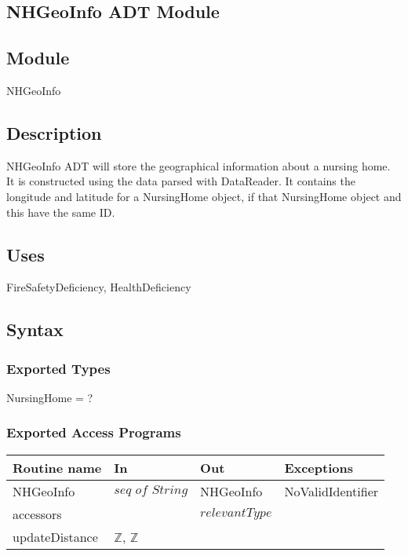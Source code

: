 \documentclass[12pt]{article}
\begin{document}
\newpage

\subsection{NHGeoInfo ADT Module}

\subsection*{Module}
NHGeoInfo
\subsection*{Description}

NHGeoInfo ADT will store the geographical information about a nursing home. It is constructed using the data parsed with DataReader. It contains the longitude and latitude for a NursingHome object, if that NursingHome object and this have the same ID.


\subsection* {Uses}

FireSafetyDeficiency, HealthDeficiency

\subsection* {Syntax}

\subsubsection* {Exported Types}

NursingHome = ?

\subsubsection* {Exported Access Programs}

\begin{tabular}{| l | l | l | l |}
\hline
\textbf{Routine name} & \textbf{In} & \textbf{Out} & \textbf{Exceptions}\\
\hline
NHGeoInfo & $\textit{seq of String}$ & NHGeoInfo & NoValidIdentifier\\
\hline
accessors & ~ & $relevant Type$ & ~\\
\hline
updateDistance & $\mathbb{Z}$, $\mathbb{Z}$ & ~  & ~\\
\hline
\end{tabular}
\end{document}

